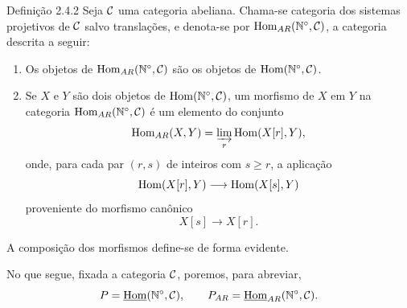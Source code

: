 \begin{statement}{Definição 2.4.2}
Seja $\mathcal C$ uma categoria abeliana. Chama-se categoria dos sistemas projetivos de $\mathcal C$ salvo translações, e denota-se por $\operatorname{Hom}_{AR}(\mathbb N^\circ,\mathcal C)$, a categoria descrita a seguir:
\begin{enumerate}[label=(\roman*)]
\item Os objetos de $\operatorname{Hom}_{AR}(\mathbb N^\circ,\mathcal C)$ são os objetos de $\operatorname{Hom}(\mathbb N^\circ,\mathcal C)$.
\item Se $X$ e $Y$ são dois objetos de $\operatorname{Hom}(\mathbb N^\circ,\mathcal C)$, um morfismo de $X$ em $Y$ na categoria $\operatorname{Hom}_{AR}(\mathbb N^\circ,\mathcal C)$ é um elemento do conjunto
\[
\operatorname{Hom}_{AR}(X,Y)=\varinjlim_r\operatorname{Hom}(X[r],Y),
\]
onde, para cada par $(r,s)$ de inteiros com $s\ge r$, a aplicação
\[
\operatorname{Hom}(X[r],Y)\longrightarrow\operatorname{Hom}(X[s],Y)
\]
proveniente do morfismo canônico
\[
X[s]\longrightarrow X[r].
\]
\end{enumerate}
A composição dos morfismos define-se de forma evidente.
\end{statement}
No que segue, fixada a categoria $\mathcal C$, poremos, para abreviar,
\[
P=\underline{\operatorname{Hom}}(\mathbb N^\circ,\mathcal C),\qquad P_{AR}=\underline{\operatorname{Hom}}_{AR}(\mathbb N^\circ,\mathcal C).
\]
